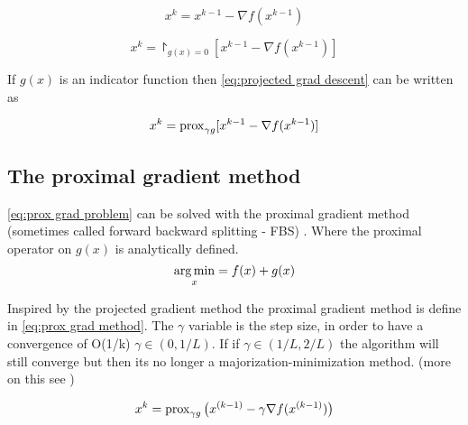 		\begin{equation}
			x^k = x^{k-1} - \nabla f(x^{k-1})
			\label{eq:grad descent}
		\end{equation}
		
		\begin{equation}
			x^k = \project_{g(x)=0}[ x^{k-1} - \nabla f(x^{k-1})]
			\label{eq:projected grad descent}
		\end{equation}
		
		If $g(x)$ is an indicator function then  \eqref{eq:projected grad descent} can be written as 
		
		\begin{equation}
				x^k = \operatorname{prox}_{\gamma g}[ x^{k-1} - \nabla f(x^{k-1})]
			\label{eq:proximal grad descent}
		\end{equation}
	
	\subsection{The proximal gradient method}
		\eqref{eq:prox grad problem} can be solved with the proximal gradient method (sometimes called forward backward splitting - FBS) . Where the proximal operator on $g(x)$ is analytically defined. 
			\begin{equation}
			\underset{x}{\operatorname*{arg\,min}} = f(x) + g(x)
			\label{eq:prox grad problem}
			\end{equation}
		
		Inspired by the projected gradient method the proximal gradient method is define in \eqref{eq:prox grad method}. The $\gamma$ variable is the step size, in order to have a convergence of O(1/k) $\gamma \in(0,1/L)$. If if $\gamma \in (1/L,2/L)$ the algorithm will still converge but then its no longer a majorization-minimization
		method. (more on this see \cite{NealParikh})
		
		\begin{equation}
			x^k = \operatorname{prox}_{\gamma g}\big( x^{(k-1)}- \gamma \nabla f(x^{(k-1)})\big)
			\label{eq:prox grad method}
		\end{equation}	
	
